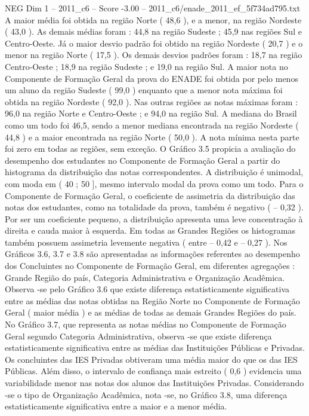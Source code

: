 \begin{textsample}{NEG Dim 1 – 2011\_c6 – Score -3.00 – 2011\_c6/enade\_2011\_ef\_5f734ad795.txt}
A maior média foi obtida na região Norte ( 48,6 ), e a menor, na região Nordeste ( 43,0 ).
As demais médias foram : 44,8 na região Sudeste ; 45,9 nas regiões Sul e Centro-Oeste.
Já o maior desvio padrão foi obtido na região Nordeste ( 20,7 ) e o menor na região Norte ( 17,5 ).
Os demais desvios padrões foram : 18,7 na região Centro-Oeste ; 18,9 na região Sudeste ; e 19,0 na região Sul.
A maior nota no Componente de Formação Geral da prova do ENADE foi obtida por pelo menos um aluno da região Sudeste ( 99,0 ) enquanto que a menor nota máxima foi obtida na região Nordeste ( 92,0 ).
Nas outras regiões as notas máximas foram : 96,0 na região Norte e Centro-Oeste ; e 94,0 na região Sul.
A mediana do Brasil como um todo foi 46,5, sendo a menor mediana encontrada na região Nordeste ( 44,8 ) e a maior encontrada na região Norte ( 50,0 ).
A nota mínima nesta parte foi zero em todas as regiões, sem exceção.
O Gráfico 3.5 propicia a avaliação do desempenho dos estudantes no Componente de Formação Geral a partir do histograma da distribuição das notas correspondentes.
A distribuição é unimodal, com moda em ( 40 ; 50 ], mesmo intervalo modal da prova como um todo.
Para o Componente de Formação Geral, o coeficiente de assimetria da distribuição das notas dos estudantes, como na totalidade da prova, também é negativo ( – 0,32 ).
Por ser um coeficiente pequeno, a distribuição apresenta uma leve concentração à direita e cauda maior à esquerda.
Em todas as Grandes Regiões os histogramas também possuem assimetria levemente negativa ( entre – 0,42 e – 0,27 ).
Nos Gráficos 3.6, 3.7 e 3.8 são apresentadas as informações referentes ao desempenho dos Concluintes no Componente de Formação Geral, em diferentes agregações : Grande Região do país, Categoria Administrativa e Organização Acadêmica.
Observa -se pelo Gráfico 3.6 que existe diferença estatisticamente significativa entre as médias das notas obtidas na Região Norte no Componente de Formação Geral ( maior média ) e as médias de todas as demais Grandes Regiões do país.
No Gráfico 3.7, que representa as notas médias no Componente de Formação Geral segundo Categoria Administrativa, observa -se que existe diferença estatisticamente significativa entre as médias das Instituições Públicas e Privadas.
Os concluintes das IES Privadas obtiveram uma média maior do que os das IES Públicas.
Além disso, o intervalo de confiança mais estreito ( 0,6 ) evidencia uma variabilidade menor nas notas dos alunos das Instituições Privadas.
Considerando -se o tipo de Organização Acadêmica, nota -se, no Gráfico 3.8, uma diferença estatisticamente significativa entre a maior e a menor média.

\end{textsample}
